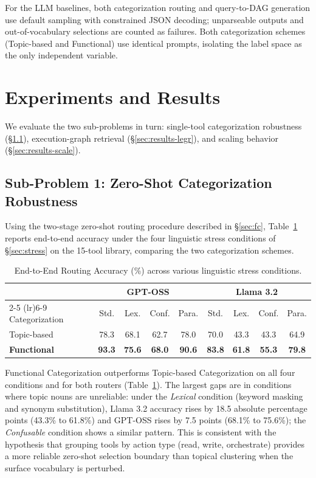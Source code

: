 \documentclass{article}
\begin{document}
For the LLM baselines, both categorization routing and query-to-DAG generation use default sampling with constrained JSON decoding; unparseable outputs and out-of-vocabulary selections are counted as failures. Both categorization schemes (Topic-based and Functional) use identical prompts, isolating the label space as the only independent variable.


\section{Experiments and Results}

We evaluate the two sub-problems in turn: single-tool categorization robustness (\S\ref{sec:results-fc}), execution-graph retrieval (\S\ref{sec:results-legr}), and scaling behavior (\S\ref{sec:results-scale}).

\subsection{Sub-Problem 1: Zero-Shot Categorization Robustness}
\label{sec:results-fc}
Using the two-stage zero-shot routing procedure described in \S\ref{sec:fc}, Table~\ref{tab:routing_results} reports end-to-end accuracy under the four linguistic stress conditions of \S\ref{sec:stress} on the 15-tool library, comparing the two categorization schemes.

\begin{table}[h]
\caption{End-to-End Routing Accuracy (\%) across various linguistic stress conditions.}
\label{tab:routing_results}
\centering
\begin{tabular}{@{}lcccccccc@{}}
\toprule
& \multicolumn{4}{c}{\textbf{GPT-OSS}} & \multicolumn{4}{c}{\textbf{Llama 3.2}} \\
\cmidrule(lr){2-5} \cmidrule(lr){6-9}
Categorization & Std. & Lex. & Conf. & Para. & Std. & Lex. & Conf. & Para. \\
\midrule
Topic-based & 78.3 & 68.1 & 62.7 & 78.0 & 70.0 & 43.3 & 43.3 & 64.9 \\
\textbf{Functional} & \textbf{93.3} & \textbf{75.6} & \textbf{68.0} & \textbf{90.6} & \textbf{83.8} & \textbf{61.8} & \textbf{55.3} & \textbf{79.8} \\
\bottomrule
\end{tabular}
\end{table}

Functional Categorization outperforms Topic-based Categorization on all four conditions and for both routers (Table~\ref{tab:routing_results}). The largest gaps are in conditions where topic nouns are unreliable: under the \textit{Lexical} condition (keyword masking and synonym substitution), Llama 3.2 accuracy rises by 18.5 absolute percentage points (43.3\% to 61.8\%) and GPT-OSS rises by 7.5 points (68.1\% to 75.6\%); the \textit{Confusable} condition shows a similar pattern. This is consistent with the hypothesis that grouping tools by action type (read, write, orchestrate) provides a more reliable zero-shot selection boundary than topical clustering when the surface vocabulary is perturbed.
\end{document}
